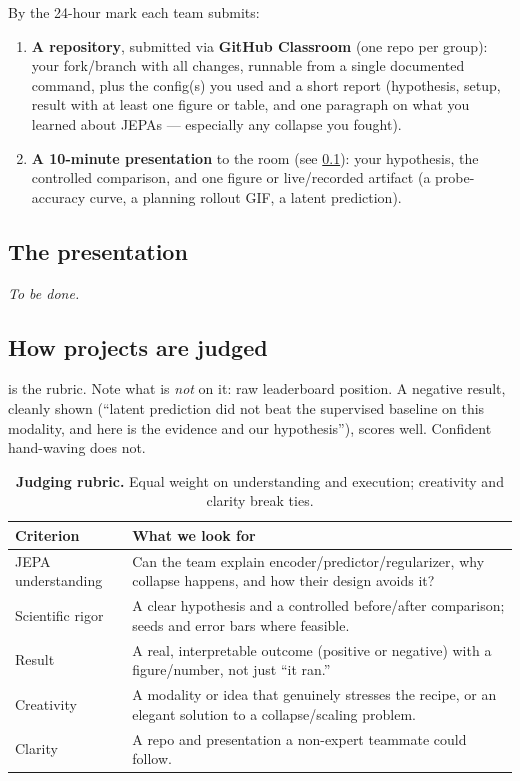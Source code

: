 \documentclass{article}
\begin{document}
By the 24-hour mark each team submits:
\begin{enumerate}[leftmargin=1.6em,itemsep=1pt,topsep=2pt]
  \item \textbf{A repository}, submitted via \textbf{GitHub Classroom} (one repo per
    group): your fork/branch with all changes, runnable from a single documented
    command, plus the config(s) you used and a short report (hypothesis, setup,
    result with at least one figure or table, and one paragraph on what you learned
    about JEPAs --- especially any collapse you fought).
  \item \textbf{A 10-minute presentation} to the room (see \cref{sec:presentation}):
    your hypothesis, the controlled comparison, and one figure or live/recorded
    artifact (a probe-accuracy curve, a planning rollout GIF, a latent prediction).
\end{enumerate}

\subsection{The presentation}
\label{sec:presentation}

\emph{To be done.}

\subsection{How projects are judged}

 is the rubric. Note what is \emph{not} on it: raw leaderboard
position. A negative result, cleanly shown (``latent prediction did not beat the
supervised baseline on this modality, and here is the evidence and our
hypothesis''), scores well. Confident hand-waving does not.

\begin{table}[h]
\centering
\caption{\textbf{Judging rubric.} Equal weight on understanding and execution;
creativity and clarity break ties.}
\label{tab:rubric}
\small
\begin{tabular}{lp{9.6cm}}
\toprule
Criterion & What we look for \\
\midrule
JEPA understanding   & Can the team explain encoder/predictor/regularizer, why collapse happens, and how their design avoids it? \\
Scientific rigor     & A clear hypothesis and a controlled before/after comparison; seeds and error bars where feasible. \\
Result               & A real, interpretable outcome (positive or negative) with a figure/number, not just ``it ran.'' \\
Creativity           & A modality or idea that genuinely stresses the recipe, or an elegant solution to a collapse/scaling problem. \\
Clarity              & A repo and presentation a non-expert teammate could follow. \\
\bottomrule
\end{tabular}
\end{table}
\end{document}

